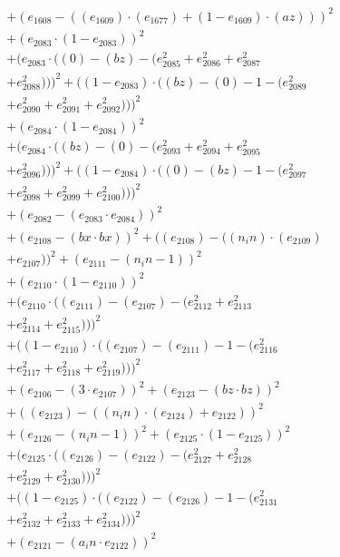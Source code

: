 \documentclass[10pt, a4paper]{article}
\begin{document}
\begin{small}
\begin{align*}
& + (e_{1608} - ((e_{1609})  \cdot  (e_{1677}) + (1 - e_{1609})  \cdot  (az)))^{2} \\
& + (e_{2083}  \cdot  (1 - e_{2083}))^{2} \\
& + (e_{2083}  \cdot  ((0) - (bz) - (e_{2085}^{2} + e_{2086}^{2} + e_{2087}^{2} \\
& + e_{2088}^{2})))^{2} + ((1 - e_{2083})  \cdot  ((bz) - (0) - 1 - (e_{2089}^{2} \\
& + e_{2090}^{2} + e_{2091}^{2} + e_{2092}^{2})))^{2} \\
& + (e_{2084}  \cdot  (1 - e_{2084}))^{2} \\
& + (e_{2084}  \cdot  ((bz) - (0) - (e_{2093}^{2} + e_{2094}^{2} + e_{2095}^{2} \\
& + e_{2096}^{2})))^{2} + ((1 - e_{2084})  \cdot  ((0) - (bz) - 1 - (e_{2097}^{2} \\
& + e_{2098}^{2} + e_{2099}^{2} + e_{2100}^{2})))^{2} \\
& + (e_{2082} - (e_{2083}  \cdot  e_{2084}))^{2} \\
& + (e_{2108} - (bx  \cdot  bx))^{2} + ((e_{2108}) - ((n_in)  \cdot  (e_{2109}) \\
& + e_{2107}))^{2} + (e_{2111} - (n_in - 1))^{2} \\
& + (e_{2110}  \cdot  (1 - e_{2110}))^{2} \\
& + (e_{2110}  \cdot  ((e_{2111}) - (e_{2107}) - (e_{2112}^{2} + e_{2113}^{2} \\
& + e_{2114}^{2} + e_{2115}^{2})))^{2} \\
& + ((1 - e_{2110})  \cdot  ((e_{2107}) - (e_{2111}) - 1 - (e_{2116}^{2} \\
& + e_{2117}^{2} + e_{2118}^{2} + e_{2119}^{2})))^{2} \\
& + (e_{2106} - (3  \cdot  e_{2107}))^{2} + (e_{2123} - (bz  \cdot  bz))^{2} \\
& + ((e_{2123}) - ((n_in)  \cdot  (e_{2124}) + e_{2122}))^{2} \\
& + (e_{2126} - (n_in - 1))^{2} + (e_{2125}  \cdot  (1 - e_{2125}))^{2} \\
& + (e_{2125}  \cdot  ((e_{2126}) - (e_{2122}) - (e_{2127}^{2} + e_{2128}^{2} \\
& + e_{2129}^{2} + e_{2130}^{2})))^{2} \\
& + ((1 - e_{2125})  \cdot  ((e_{2122}) - (e_{2126}) - 1 - (e_{2131}^{2} \\
& + e_{2132}^{2} + e_{2133}^{2} + e_{2134}^{2})))^{2} \\
& + (e_{2121} - (a_in  \cdot  e_{2122}))^{2} \\

\end{align*}
\end{small}
\end{document}
